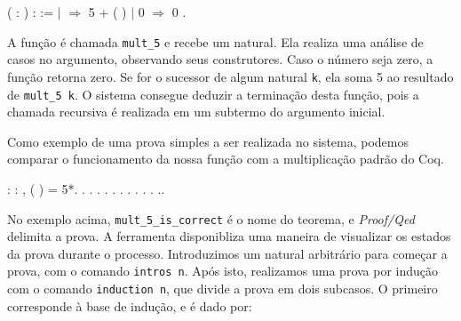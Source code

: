\bigskip
\coqdocnoindent {}  ( :
) :  :=\coqdoceol \coqdocindent{2.00em}
  \coqdoceol \coqdocindent{2.00em}
\ensuremath{|}   \ensuremath{\Rightarrow} 5 +
( )\coqdoceol \coqdocindent{2.00em}
\ensuremath{|} 0   \ensuremath{\Rightarrow} 0\coqdoceol \coqdocindent{2.00em}
.\coqdoceol \coqdocemptyline
\bigskip

A função é chamada \texttt{mult\_5} e recebe um natural. Ela realiza uma
análise de casos no argumento, observando seus construtores. Caso o número seja
zero, a função retorna zero. Se for o sucessor de algum natural \texttt{k}, ela
soma 5 ao resultado de \texttt{mult\_5 k}. O sistema consegue deduzir a
terminação desta função, pois a chamada recursiva é realizada em um subtermo do
argumento inicial.

Como exemplo de uma prova simples a ser realizada no sistema, podemos comparar
o funcionamento da nossa função com a multiplicação padrão do Coq.

\bigskip
\coqdocnoindent
{} :
\coqdockw{\ensuremath{\forall}}  : ,
( ) = 5*.\coqdoceol \coqdocnoindent
{}.\coqdoceol \coqdocindent{2.00em} .\coqdoceol
\coqdocindent{2.00em}  .\coqdoceol
\coqdocindent{2.00em} . .\coqdoceol
\coqdocindent{2.00em}  .\coqdoceol
\coqdocindent{2.00em}  .\coqdoceol
\coqdocindent{2.00em} .\coqdoceol \coqdocindent{2.00em}
 .\coqdoceol \coqdocindent{2.00em}
 .\coqdoceol \coqdocindent{2.00em}
.\coqdoceol \coqdocnoindent {}.\coqdoceol
\bigskip

No exemplo acima, \texttt{mult\_5\_is\_correct} é o nome do teorema, e
\emph{Proof/Qed} delimita a prova.  A ferramenta disponibliza uma maneira de
visualizar os estados da prova durante o processo. Introduzimos um natural
arbitrário para começar a prova, com o comando \texttt{intros n}. Após isto,
realizamos uma prova por indução com o comando \texttt{induction n}, que divide
a prova em dois subcasos. O primeiro corresponde à base de indução, e é dado
por:

